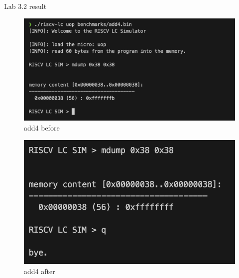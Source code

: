 \documentclass[12pt, a4paper]{article}
\begin{document}
\begin{qNoMark}
Lab 3.2 result
\end{qNoMark}

\begin{ans}
    \begin{figure}[H]
        \caption{add4 before}
        \includegraphics[width=1\linewidth]{../figs/add4-before-1.png}
    \end{figure}
    \begin{figure}[H]
        \caption{add4 after}
        \includegraphics[width=1\linewidth]{../figs/add4-after-1.png}
    \end{figure}
    

\end{ans}
\end{document}
